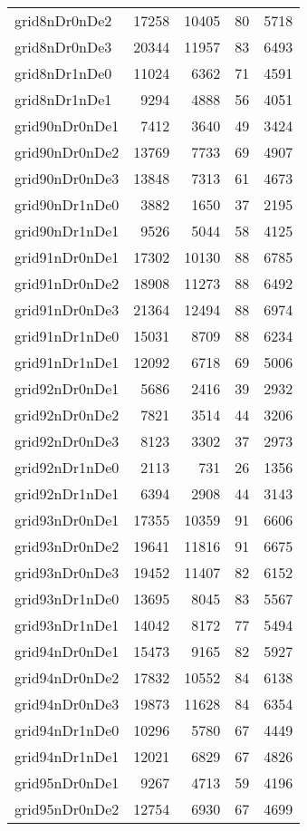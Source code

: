\begin{longtable}{lrrrr}
grid8nDr0nDe2 & 17258 & 10405 & 80 & 5718 \\
grid8nDr0nDe3 & 20344 & 11957 & 83 & 6493 \\
grid8nDr1nDe0 & 11024 & 6362 & 71 & 4591 \\
grid8nDr1nDe1 & 9294 & 4888 & 56 & 4051 \\
grid90nDr0nDe1 & 7412 & 3640 & 49 & 3424 \\
grid90nDr0nDe2 & 13769 & 7733 & 69 & 4907 \\
grid90nDr0nDe3 & 13848 & 7313 & 61 & 4673 \\
grid90nDr1nDe0 & 3882 & 1650 & 37 & 2195 \\
grid90nDr1nDe1 & 9526 & 5044 & 58 & 4125 \\
grid91nDr0nDe1 & 17302 & 10130 & 88 & 6785 \\
grid91nDr0nDe2 & 18908 & 11273 & 88 & 6492 \\
grid91nDr0nDe3 & 21364 & 12494 & 88 & 6974 \\
grid91nDr1nDe0 & 15031 & 8709 & 88 & 6234 \\
grid91nDr1nDe1 & 12092 & 6718 & 69 & 5006 \\
grid92nDr0nDe1 & 5686 & 2416 & 39 & 2932 \\
grid92nDr0nDe2 & 7821 & 3514 & 44 & 3206 \\
grid92nDr0nDe3 & 8123 & 3302 & 37 & 2973 \\
grid92nDr1nDe0 & 2113 & 731 & 26 & 1356 \\
grid92nDr1nDe1 & 6394 & 2908 & 44 & 3143 \\
grid93nDr0nDe1 & 17355 & 10359 & 91 & 6606 \\
grid93nDr0nDe2 & 19641 & 11816 & 91 & 6675 \\
grid93nDr0nDe3 & 19452 & 11407 & 82 & 6152 \\
grid93nDr1nDe0 & 13695 & 8045 & 83 & 5567 \\
grid93nDr1nDe1 & 14042 & 8172 & 77 & 5494 \\
grid94nDr0nDe1 & 15473 & 9165 & 82 & 5927 \\
grid94nDr0nDe2 & 17832 & 10552 & 84 & 6138 \\
grid94nDr0nDe3 & 19873 & 11628 & 84 & 6354 \\
grid94nDr1nDe0 & 10296 & 5780 & 67 & 4449 \\
grid94nDr1nDe1 & 12021 & 6829 & 67 & 4826 \\
grid95nDr0nDe1 & 9267 & 4713 & 59 & 4196 \\
grid95nDr0nDe2 & 12754 & 6930 & 67 & 4699 \\

\end{longtable}
